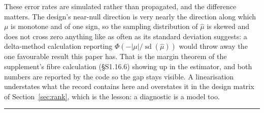 These error rates are simulated rather than propagated, and the difference matters. The
design's near-null direction is very nearly the direction along which $\mu$ is monotone
and of one sign, so the sampling distribution of $\hat\mu$ is skewed and does not cross
zero anything like as often as its standard deviation suggests: a delta-method calculation
reporting $\Phi(-|\mu|/\operatorname{sd}(\hat\mu))$ would throw away the one favourable
result this paper has. That is the margin theorem of the supplement's fibre calculation
(\S S1.16.6) showing up in the estimator, and both numbers are reported by the code so the gap
stays visible. A linearisation understates what the record contains here and overstates it
in the design matrix of Section~\ref{sec:rank}, which is the lesson: a diagnostic is a
model too.


\vspace{0.5em}
\hrule
\vspace{1em}

